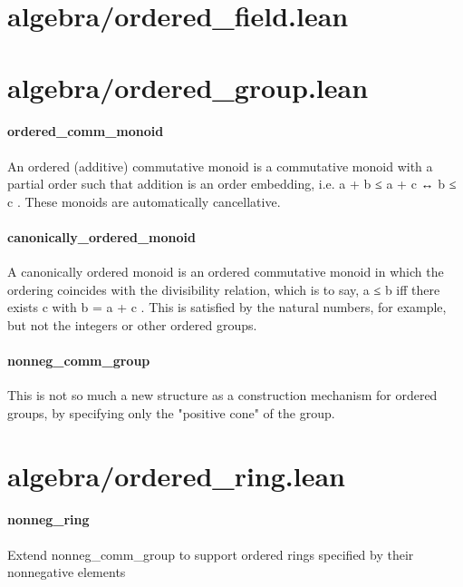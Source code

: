 \documentclass{article}
\begin{document}
\section{algebra/ordered\_field.lean}\section{algebra/ordered\_group.lean}\paragraph{ordered\_comm\_monoid}
\par
An ordered (additive) commutative monoid is a commutative monoid
with a partial order such that addition is an order embedding, i.e.
\colorbox[RGB]{253,246,227}{{{{\color[RGB]{101, 123, 131} a  }}}{{{\color[RGB]{181, 137, 0} + }}}{{{\color[RGB]{101, 123, 131}  b  }}}{{{\color[RGB]{181, 137, 0} ≤ }}}{{{\color[RGB]{101, 123, 131}  a  }}}{{{\color[RGB]{181, 137, 0} + }}}{{{\color[RGB]{101, 123, 131}  c  }}}{{{\color[RGB]{181, 137, 0} ↔ }}}{{{\color[RGB]{101, 123, 131}  b  }}}{{{\color[RGB]{181, 137, 0} ≤ }}}{{{\color[RGB]{101, 123, 131}  c }}}}. These monoids are automatically cancellative.
\paragraph{canonically\_ordered\_monoid}
\par
A canonically ordered monoid is an ordered commutative monoid
in which the ordering coincides with the divisibility relation,
which is to say, 
\colorbox[RGB]{253,246,227}{{{{\color[RGB]{101, 123, 131} a  }}}{{{\color[RGB]{181, 137, 0} ≤ }}}{{{\color[RGB]{101, 123, 131}  b }}}} iff there exists 
\colorbox[RGB]{253,246,227}{{{{\color[RGB]{101, 123, 131} c }}}} with 
\colorbox[RGB]{253,246,227}{{{{\color[RGB]{101, 123, 131} b  }}}{{{\color[RGB]{181, 137, 0} = }}}{{{\color[RGB]{101, 123, 131}  a  }}}{{{\color[RGB]{181, 137, 0} + }}}{{{\color[RGB]{101, 123, 131}  c }}}}.
This is satisfied by the natural numbers, for example, but not
the integers or other ordered groups.
\paragraph{nonneg\_comm\_group}
\par
This is not so much a new structure as a construction mechanism
for ordered groups, by specifying only the "positive cone" of the group.
\section{algebra/ordered\_ring.lean}\paragraph{nonneg\_ring}
\par
Extend 
\colorbox[RGB]{253,246,227}{{{{\color[RGB]{101, 123, 131} nonneg\_comm\_group }}}} to support ordered rings
specified by their nonnegative elements
\end{document}
